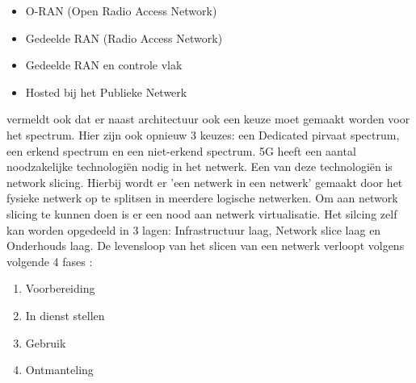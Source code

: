 \begin{itemize}
  \item O-RAN (Open Radio Access Network)
  \item Gedeelde RAN (Radio Access Network)
  \item Gedeelde RAN en controle vlak
  \item Hosted bij het Publieke Netwerk
\end{itemize}

\textcite{wen2021private} vermeldt ook dat er naast architectuur ook een keuze moet gemaakt worden voor het spectrum. Hier zijn ook opnieuw 3 keuzes: een Dedicated pirvaat spectrum, een erkend spectrum en een niet-erkend spectrum. 
5G heeft een aantal noodzakelijke technologiën nodig in het netwerk. Een van deze technologiën is network slicing. Hierbij wordt er 'een netwerk in een netwerk' gemaakt door het fysieke netwerk op te splitsen in meerdere logische netwerken. Om aan network slicing te kunnen doen is er een nood aan netwerk virtualisatie. Het silcing zelf kan worden opgedeeld in 3 lagen: Infrastructuur laag, Network slice laag en Onderhouds laag. De levensloop van het slicen van een netwerk verloopt volgens volgende 4 fases \autocite{wen2021private}:

\begin{enumerate}
  \item Voorbereiding
  \item In dienst stellen
  \item Gebruik
  \item Ontmanteling
\end{enumerate}

